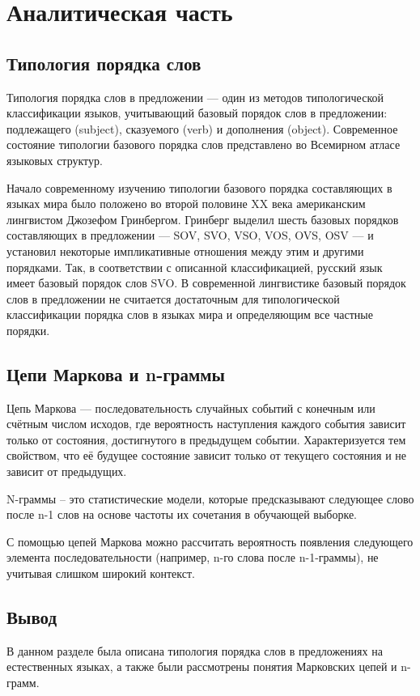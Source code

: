 \chapter{Аналитическая часть}

\section{Типология порядка слов}

Типология порядка слов в предложении — один из методов типологической классификации языков, учитывающий базовый порядок слов в предложении: подлежащего (subject), сказуемого (verb) и дополнения (object). Современное состояние типологии базового порядка слов представлено во Всемирном атласе языковых структур.~\cite{map}

Начало современному изучению типологии базового порядка составляющих в языках мира было положено во второй половине XX века американским лингвистом Джозефом Гринбергом. Гринберг выделил шесть базовых порядков составляющих в предложении — SOV, SVO, VSO, VOS, OVS, OSV — и установил некоторые импликативные отношения между этим и другими порядками. Так, в соответствии с описанной классификацией, русский язык имеет базовый порядок слов SVO. В современной лингвистике базовый порядок слов в предложении не считается достаточным для типологической классификации порядка слов в языках мира и определяющим все частные порядки.

\section{Цепи Маркова и n-граммы}

Цепь Маркова — последовательность случайных событий с конечным или счётным числом исходов, где вероятность наступления каждого события зависит только от состояния, достигнутого в предыдущем событии. Характеризуется тем свойством, что её будущее состояние зависит только от текущего состояния и не зависит от предыдущих.

N-граммы – это статистические модели, которые предсказывают следующее слово после n-1 слов на основе частоты их сочетания в обучающей выборке.

С помощью цепей Маркова можно рассчитать вероятность появления следующего элемента последовательности (например, n-го слова после n-1-граммы), не учитывая слишком широкий контекст. 

\section*{Вывод}

В данном разделе была описана типология порядка слов в предложениях на естественных языках, а также были рассмотрены понятия Марковских цепей и n-грамм.

\clearpage
